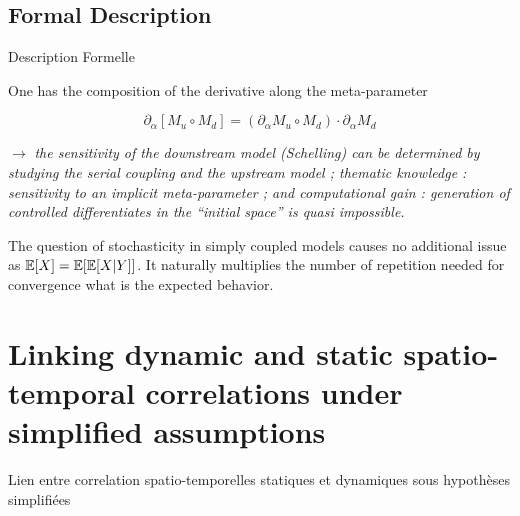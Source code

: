 



\subsection{Formal Description}{Description Formelle}


One has the composition of the derivative along the meta-parameter

\[
\partial_{\alpha}\left[M_u \circ M_d\right] = \left(\partial_{\alpha} M_u \circ M_d \right)\cdot \partial_{\alpha} M_d
\]

$\rightarrow$ \textit{the sensitivity of the downstream model (Schelling) can be determined by studying the serial coupling and the upstream model ; thematic knowledge : sensitivity to an implicit meta-parameter ; and computational gain : generation of controlled differentiates in the ``initial space'' is quasi impossible.}


The question of stochasticity in simply coupled models causes no additional issue as $\operatorname{\mathbb{E}}\!\left[X\right]=\operatorname{\mathbb{E}}\!\left[\operatorname{\mathbb{E}}\!\left[X|Y\right]\right]$. It naturally multiplies the number of repetition needed for convergence what is the expected behavior.







\newpage




\section[Spatio-temporal Correlations]{Linking dynamic and static spatio-temporal correlations under simplified assumptions}{Lien entre correlation spatio-temporelles statiques et dynamiques sous hypothèses simplifiées}


